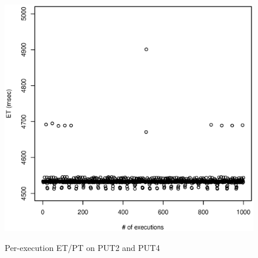 \documentclass[10pt]{article}
\begin{document}
\begin{figure}[H]
{		\includegraphics[scale=0.43]{figures/sodb8-ntp-on-turbo-off/4_sec_et_all.eps}
		\label{fig:4_sec_ect}
	}
	\caption{Per-execution ET/PT on PUT2 and PUT4~\label{fig:sync_time}}
\end{figure}
\end{document}
